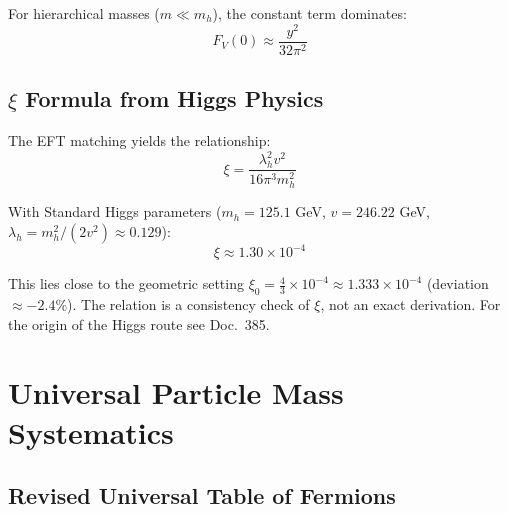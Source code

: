 	For hierarchical masses ($m \ll m_h$), the constant term dominates:
	\begin{equation}
		F_V(0) \approx \frac{y^2}{32\pi^2}
	\end{equation}
	
	\subsection{$\xi$ Formula from Higgs Physics}
	\label{subsec:final_xi_formula}
	
	The EFT matching yields the relationship:
	\begin{equation}
		\boxed{\xi = \frac{\lambda_h^2 v^2}{16\pi^3 m_h^2}}
	\end{equation}
	
	With Standard Higgs parameters ($m_h = 125.1$ GeV, $v = 246.22$ GeV, $\lambda_h = m_h^2/(2v^2) \approx 0.129$):
	\begin{equation}
		\xi \approx 1.30 \times 10^{-4}
	\end{equation}
	
	This lies close to the geometric setting $\xi_0 = \frac{4}{3} \times 10^{-4} \approx 1.333 \times 10^{-4}$ (deviation $\approx -2.4\%$). The relation is a consistency check of $\xi$, not an exact derivation. For the origin of the Higgs route see Doc.~385.
	
	\section{Universal Particle Mass Systematics}
	\label{sec:universal_masses}
	
	\subsection{Revised Universal Table of Fermions}
	\label{subsec:universal_table}
	
